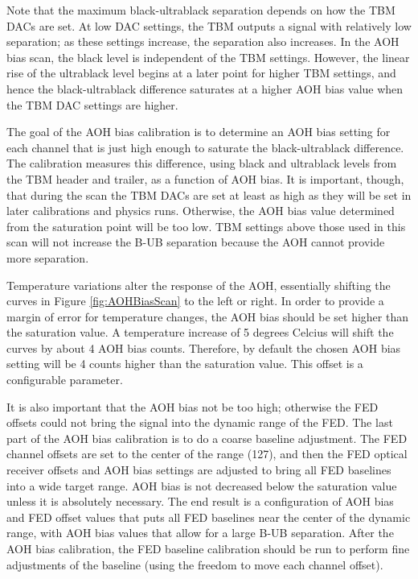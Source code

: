 Note that the maximum black-ultrablack separation depends on how the TBM DACs are set.  At low DAC settings, the TBM outputs a signal with relatively low separation; as these settings increase, the separation also increases.  In the AOH bias scan, the black level is independent of the TBM settings.  However, the linear rise of the ultrablack level begins at a later point for higher TBM settings, and hence the black-ultrablack difference saturates at a higher AOH bias value when the TBM DAC settings are higher.

The goal of the AOH bias calibration is to determine an AOH bias setting for each channel that is just high enough to saturate the black-ultrablack difference.  The calibration measures this difference, using black and ultrablack levels from the TBM header and trailer, as a function of AOH bias.  It is important, though, that during the scan the TBM DACs are set at least as high as they will be set in later calibrations and physics runs.  Otherwise, the AOH bias value determined from the saturation point will be too low. TBM settings above those used in this scan will not increase the B-UB separation because the AOH cannot provide more separation.

Temperature variations alter the response of the AOH, essentially shifting the curves in Figure \ref{fig:AOHBiasScan} to the left or right.  In order to provide a margin of error for temperature changes, the AOH bias should be set higher than the saturation value.  A temperature increase of 5 degrees Celcius will shift the curves by about 4 AOH bias counts.  Therefore, by default the chosen AOH bias setting will be 4 counts higher than the saturation value.  This offset is a configurable parameter.

It is also important that the AOH bias not be too high; otherwise the FED offsets could not bring the signal into the dynamic range of the FED. The last part of the AOH bias calibration is to do a coarse baseline adjustment.  The FED channel offsets are set to the center of the range (127), and then the FED optical receiver offsets and AOH bias settings are adjusted to bring all FED baselines into a wide target range.  AOH bias is not decreased below the saturation value unless it is absolutely necessary. The end result is a configuration of AOH bias and FED offset values that puts all FED baselines near the center of the dynamic range, with AOH bias values that allow for a large B-UB separation.  After the AOH bias calibration, the FED baseline calibration should be run to perform fine adjustments of the baseline (using the freedom to move each channel offset).

